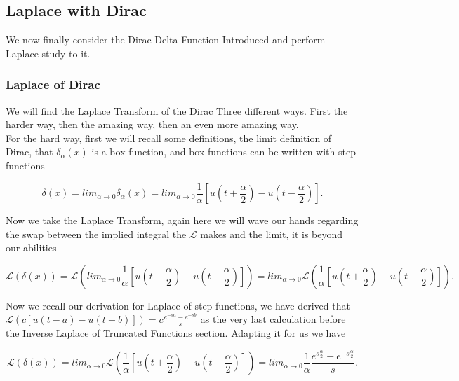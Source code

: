 \documentclass[12pt]{article}
\newcommand{\lp}{\mathscr{L}}
\begin{document}
\subsection{Laplace with Dirac}

We now finally consider the Dirac Delta Function Introduced and perform Laplace study to it.

\subsubsection{Laplace of Dirac}

We will find the Laplace Transform of the Dirac Three different ways. First the harder way, then the amazing way, then an even more amazing way. \\

For the hard way, first we will recall some definitions, the limit definition of Dirac, that $\delta_{\alpha}(x)$ is a box function, and box functions can be written with step functions

\begin{equation*}
    \delta(x)=lim_{\alpha\rightarrow0} \delta_{\alpha}(x)= lim_{\alpha\rightarrow0} \frac{1}{\alpha}\left[u(t+\frac{\alpha}{2})-u(t-\frac{\alpha}{2})\right].
\end{equation*}

Now we take the Laplace Transform, again here we will wave our hands regarding the swap between the implied integral the $\lp$ makes and the limit, it is beyond our abilities

\begin{equation*}
    \lp(\delta(x))= \lp\left(lim_{\alpha\rightarrow0} \frac{1}{\alpha}\left[u(t+\frac{\alpha}{2})-u(t-\frac{\alpha}{2})\right]\right)=lim_{\alpha\rightarrow0} \lp\left(\frac{1}{\alpha}\left[u(t+\frac{\alpha}{2})-u(t-\frac{\alpha}{2})\right]\right).
\end{equation*}

Now we recall our derivation for Laplace of step functions, we have derived that $\lp(c[u(t-a)-u(t-b)])=c\frac{e^{-sa}-e^{-sb}}{s}$ as the very last calculation before the Inverse Laplace of Truncated Functions section. Adapting it for us we have

\begin{equation*}
    \lp(\delta(x))=lim_{\alpha\rightarrow0} \lp\left(\frac{1}{\alpha}\left[u(t+\frac{\alpha}{2})-u(t-\frac{\alpha}{2})\right]\right)=lim_{\alpha\rightarrow0}\frac{1}{\alpha}\frac{e^{s\frac{\alpha}{2}}-e^{-s\frac{\alpha}{2}}}{s}.
\end{equation*}
\end{document}
